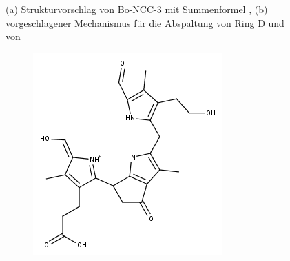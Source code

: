 \begin{figure}[!htbp]
\begin{subfigure}[b]{0.5\textwidth}
    \caption{}
    \label{fig:480Mechanismus}
  \end{subfigure}
  \caption[Strukturvorschlag von Bo-NCC-3 und Vorschlag für Mechanismus der Abspaltung von Ring D, Quelle: Autor]{(a) Strukturvorschlag von Bo-NCC-3 mit Summenformel \ch{}, (b) vorgeschlagener Mechanismus für die Abspaltung von Ring D und von }
\end{figure}

\begin{figure}[!htbp]
  \begin{subfigure}[b]{0.5\textwidth}
    \includegraphics[width=\textwidth]{figures/Kapitel7/Kataboliten/fragmentation_structures/VWA_Katabolit_647-CO2-RingD_480_MH_Enolform.png}
    \caption{}
    \label{fig:NCC2725}
  \end{subfigure}
  \hfill
  \begin{subfigure}[b]{0.5\textwidth}

\end{subfigure}
\end{figure}
